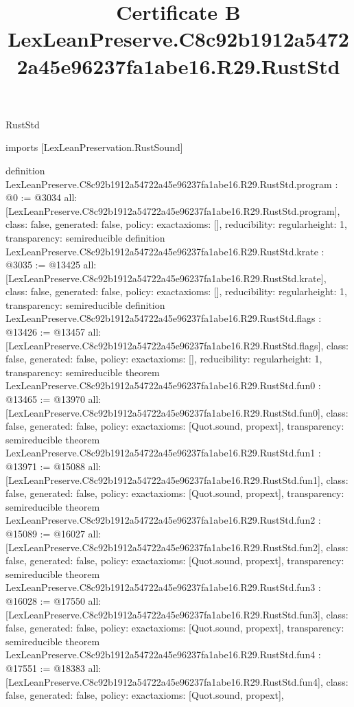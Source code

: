 \begin{lexlean}{RustStd}
\title{Certificate B LexLeanPreserve.C8c92b1912a54722a45e96237fa1abe16.R29.RustStd}
\begin{coremodule}
imports [LexLeanPreservation.RustSound]

definition LexLeanPreserve.C8c92b1912a54722a45e96237fa1abe16.R29.RustStd.program : @0 := @3034 {
  all: [LexLeanPreserve.C8c92b1912a54722a45e96237fa1abe16.R29.RustStd.program],
  class: false,
  generated: false,
  policy: exact{axioms: []},
  reducibility: regular{height: 1},
  transparency: semireducible
}
definition LexLeanPreserve.C8c92b1912a54722a45e96237fa1abe16.R29.RustStd.krate : @3035 := @13425 {
  all: [LexLeanPreserve.C8c92b1912a54722a45e96237fa1abe16.R29.RustStd.krate],
  class: false,
  generated: false,
  policy: exact{axioms: []},
  reducibility: regular{height: 1},
  transparency: semireducible
}
definition LexLeanPreserve.C8c92b1912a54722a45e96237fa1abe16.R29.RustStd.flags : @13426 := @13457 {
  all: [LexLeanPreserve.C8c92b1912a54722a45e96237fa1abe16.R29.RustStd.flags],
  class: false,
  generated: false,
  policy: exact{axioms: []},
  reducibility: regular{height: 1},
  transparency: semireducible
}
theorem LexLeanPreserve.C8c92b1912a54722a45e96237fa1abe16.R29.RustStd.fun0 : @13465 := @13970 {
  all: [LexLeanPreserve.C8c92b1912a54722a45e96237fa1abe16.R29.RustStd.fun0],
  class: false,
  generated: false,
  policy: exact{axioms: [Quot.sound, propext]},
  transparency: semireducible
}
theorem LexLeanPreserve.C8c92b1912a54722a45e96237fa1abe16.R29.RustStd.fun1 : @13971 := @15088 {
  all: [LexLeanPreserve.C8c92b1912a54722a45e96237fa1abe16.R29.RustStd.fun1],
  class: false,
  generated: false,
  policy: exact{axioms: [Quot.sound, propext]},
  transparency: semireducible
}
theorem LexLeanPreserve.C8c92b1912a54722a45e96237fa1abe16.R29.RustStd.fun2 : @15089 := @16027 {
  all: [LexLeanPreserve.C8c92b1912a54722a45e96237fa1abe16.R29.RustStd.fun2],
  class: false,
  generated: false,
  policy: exact{axioms: [Quot.sound, propext]},
  transparency: semireducible
}
theorem LexLeanPreserve.C8c92b1912a54722a45e96237fa1abe16.R29.RustStd.fun3 : @16028 := @17550 {
  all: [LexLeanPreserve.C8c92b1912a54722a45e96237fa1abe16.R29.RustStd.fun3],
  class: false,
  generated: false,
  policy: exact{axioms: [Quot.sound, propext]},
  transparency: semireducible
}
theorem LexLeanPreserve.C8c92b1912a54722a45e96237fa1abe16.R29.RustStd.fun4 : @17551 := @18383 {
  all: [LexLeanPreserve.C8c92b1912a54722a45e96237fa1abe16.R29.RustStd.fun4],
  class: false,
  generated: false,
  policy: exact{axioms: [Quot.sound, propext]},
}
\end{coremodule}
\end{lexlean}
